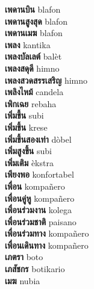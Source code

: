 \textbf{ เพดานบิน  } blafon \\
\textbf{ เพดานสูงสุด  } blafon \\
\textbf{ เพดานเมฆ  } blafon \\
\textbf{ เพลง  } kantika \\
\textbf{ เพลงบัลเลต์  } balèt \\
\textbf{ เพลงสดุดี  } himno \\
\textbf{ เพลงสวดสรรเสริญ  } himno \\
\textbf{ เพลิงไหม้  } candela \\
\textbf{ เพิกเฉย  } rebaha \\
\textbf{ เพิ่มขี้น  } subi \\
\textbf{ เพิ่มขึ้น  } krese \\
\textbf{ เพิ่มขึ้นสองเท่า  } dòbel \\
\textbf{ เพิ่มสูงขึ้น  } subi \\
\textbf{ เพิ่มเติม  } èkstra \\
\textbf{ เพียงพอ  } konfortabel \\
\textbf{ เพื่อน  } kompañero \\
\textbf{ เพื่อนคู่หู  } kompañero \\
\textbf{ เพื่อนร่วมงาน  } kolega \\
\textbf{ เพื่อนร่วมชาติ  } paisano \\
\textbf{ เพื่อนร่วมทาง  } kompañero \\
\textbf{ เพื่อนเดินทาง  } kompañero \\
\textbf{ เภตรา  } boto \\
\textbf{ เภสัชกร  } botikario \\
\textbf{ เมฆ  } nubia \\
